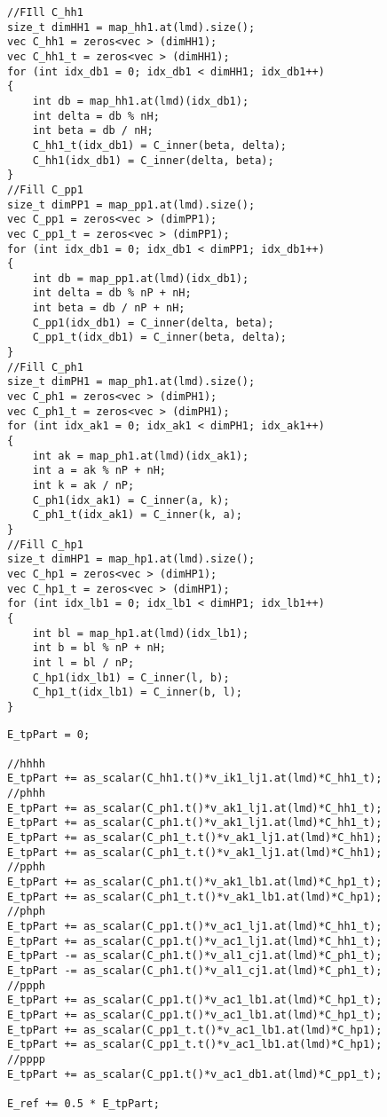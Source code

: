 \begin{lstlisting}[float,label={lst:CC:hfE_C},caption={Filling the coefficients from eq~\eqref{eq:CC:mapHFcoeff}. $C^N$ is stored in `C\_xx1' whereas $C^P$ is stored in `C\_xx1\_t'.}]
//FIll C_hh1
size_t dimHH1 = map_hh1.at(lmd).size();
vec C_hh1 = zeros<vec > (dimHH1);
vec C_hh1_t = zeros<vec > (dimHH1);
for (int idx_db1 = 0; idx_db1 < dimHH1; idx_db1++)
{
    int db = map_hh1.at(lmd)(idx_db1);
    int delta = db % nH;
    int beta = db / nH;
    C_hh1_t(idx_db1) = C_inner(beta, delta);
	C_hh1(idx_db1) = C_inner(delta, beta);
}
//Fill C_pp1
size_t dimPP1 = map_pp1.at(lmd).size();
vec C_pp1 = zeros<vec > (dimPP1);
vec C_pp1_t = zeros<vec > (dimPP1);
for (int idx_db1 = 0; idx_db1 < dimPP1; idx_db1++)
{
    int db = map_pp1.at(lmd)(idx_db1);
    int delta = db % nP + nH;
    int beta = db / nP + nH;
    C_pp1(idx_db1) = C_inner(delta, beta);
	C_pp1_t(idx_db1) = C_inner(beta, delta);
}
//Fill C_ph1
size_t dimPH1 = map_ph1.at(lmd).size();
vec C_ph1 = zeros<vec > (dimPH1);
vec C_ph1_t = zeros<vec > (dimPH1);
for (int idx_ak1 = 0; idx_ak1 < dimPH1; idx_ak1++)
{
    int ak = map_ph1.at(lmd)(idx_ak1);
    int a = ak % nP + nH;
    int k = ak / nP;
    C_ph1(idx_ak1) = C_inner(a, k);
	C_ph1_t(idx_ak1) = C_inner(k, a);
}
//Fill C_hp1
size_t dimHP1 = map_hp1.at(lmd).size();
vec C_hp1 = zeros<vec > (dimHP1);
vec C_hp1_t = zeros<vec > (dimHP1);
for (int idx_lb1 = 0; idx_lb1 < dimHP1; idx_lb1++)
{
    int bl = map_hp1.at(lmd)(idx_lb1);
    int b = bl % nP + nH;
    int l = bl / nP;
    C_hp1(idx_lb1) = C_inner(l, b);
	C_hp1_t(idx_lb1) = C_inner(b, l);
}
\end{lstlisting}


\begin{lstlisting}[float,label={lst:CC:hf_E_tp},caption={Two-particle part of HF energy.}]
E_tpPart = 0;

//hhhh
E_tpPart += as_scalar(C_hh1.t()*v_ik1_lj1.at(lmd)*C_hh1_t);
//phhh
E_tpPart += as_scalar(C_ph1.t()*v_ak1_lj1.at(lmd)*C_hh1_t);
E_tpPart += as_scalar(C_ph1.t()*v_ak1_lj1.at(lmd)*C_hh1_t);
E_tpPart += as_scalar(C_ph1_t.t()*v_ak1_lj1.at(lmd)*C_hh1);
E_tpPart += as_scalar(C_ph1_t.t()*v_ak1_lj1.at(lmd)*C_hh1);
//pphh
E_tpPart += as_scalar(C_ph1.t()*v_ak1_lb1.at(lmd)*C_hp1_t);
E_tpPart += as_scalar(C_ph1_t.t()*v_ak1_lb1.at(lmd)*C_hp1);
//phph
E_tpPart += as_scalar(C_pp1.t()*v_ac1_lj1.at(lmd)*C_hh1_t);
E_tpPart += as_scalar(C_pp1.t()*v_ac1_lj1.at(lmd)*C_hh1_t);
E_tpPart -= as_scalar(C_ph1.t()*v_al1_cj1.at(lmd)*C_ph1_t);
E_tpPart -= as_scalar(C_ph1.t()*v_al1_cj1.at(lmd)*C_ph1_t);
//ppph
E_tpPart += as_scalar(C_pp1.t()*v_ac1_lb1.at(lmd)*C_hp1_t);
E_tpPart += as_scalar(C_pp1.t()*v_ac1_lb1.at(lmd)*C_hp1_t);
E_tpPart += as_scalar(C_pp1_t.t()*v_ac1_lb1.at(lmd)*C_hp1);
E_tpPart += as_scalar(C_pp1_t.t()*v_ac1_lb1.at(lmd)*C_hp1);
//pppp
E_tpPart += as_scalar(C_pp1.t()*v_ac1_db1.at(lmd)*C_pp1_t);

E_ref += 0.5 * E_tpPart;
\end{lstlisting}





